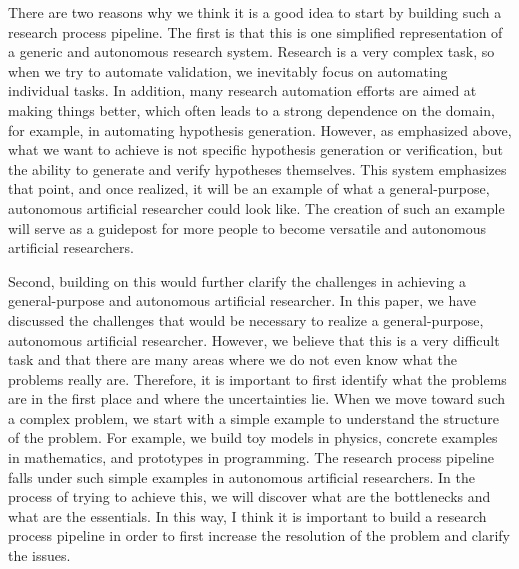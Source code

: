 There are two reasons why we think it is a good idea to start by building such a research process pipeline. The first is that this is one simplified representation of a generic and autonomous research system. Research is a very complex task, so when we try to automate validation, we inevitably focus on automating individual tasks. In addition, many research automation efforts are aimed at making things better, which often leads to a strong dependence on the domain, for example, in automating hypothesis generation. However, as emphasized above, what we want to achieve is not specific hypothesis generation or verification, but the ability to generate and verify hypotheses themselves. This system emphasizes that point, and once realized, it will be an example of what a general-purpose, autonomous artificial researcher could look like. The creation of such an example will serve as a guidepost for more people to become versatile and autonomous artificial researchers.

Second, building on this would further clarify the challenges in achieving a general-purpose and autonomous artificial researcher. In this paper, we have discussed the challenges that would be necessary to realize a general-purpose, autonomous artificial researcher. However, we believe that this is a very difficult task and that there are many areas where we do not even know what the problems really are. Therefore, it is important to first identify what the problems are in the first place and where the uncertainties lie. When we move toward such a complex problem, we start with a simple example to understand the structure of the problem. For example, we build toy models in physics, concrete examples in mathematics, and prototypes in programming. The research process pipeline falls under such simple examples in autonomous artificial researchers. In the process of trying to achieve this, we will discover what are the bottlenecks and what are the essentials. In this way, I think it is important to build a research process pipeline in order to first increase the resolution of the problem and clarify the issues.

